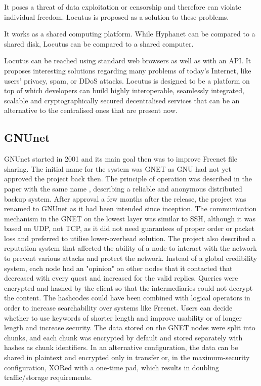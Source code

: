 It poses a threat of data exploitation or censorship and therefore can violate individual freedom. Locutus is proposed as a solution to these problems.

It works as a shared computing platform. While Hyphanet can be compared to a shared disk, Locutus can be compared to a shared computer.

Locutus can be reached using standard web browsers as well as with an API. It proposes interesting solutions regarding many problems of today’s Internet, like users' privacy, spam, or DDoS attacks. Locutus is designed to be a platform on top of which developers can build highly interoperable, seamlessly integrated, scalable and cryptographically secured decentralised services that can be an alternative to the centralised ones that are present now.

\subsection{GNUnet}
GNUnet started in 2001 and its main goal then was to improve Freenet file sharing. The initial name for the system was GNET as GNU had not yet approved the project back then. The principle of operation was described in the paper with the same name \cite{gnet}, describing a reliable and anonymous distributed backup system. After approval a few months after the release, the project was renamed to GNUnet as it had been intended since inception. The communication mechanism in the GNET on the lowest layer was similar to SSH, although it was based on UDP, not TCP, as it did not need guarantees of proper order or packet loss and preferred to utilise lower-overhead solution. The project also described a reputation system that affected the ability of a node to interact with the network to prevent various attacks and protect the network. Instead of a global credibility system, each node had an "opinion" on other nodes that it contacted that decreased with every quest and increased for the valid replies. Queries were encrypted and hashed by the client so that the intermediaries could not decrypt the content. The hashcodes could have been combined with logical operators in order to increase searchability over systems like Freenet. Users can decide whether to use keywords of shorter length and improve usability or of longer length and increase security. The data stored on the GNET nodes were split into chunks, and each chunk was encrypted by default and stored separately with hashes as chunk identifiers. In an alternative configuration, the data can be shared in plaintext and encrypted only in transfer or, in the maximum-security configuration, XORed with a one-time pad, which results in doubling traffic/storage requirements.

